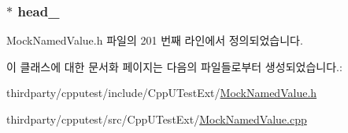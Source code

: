 \subsubsection[{\texorpdfstring{head\+\_\+}{head_}}]{$\ast$ head\+\_\+\hspace{0.3cm}{\ttfamily [private]}}\hypertarget{class_mock_named_value_list_a3bb1ff05bd34f0ac2f0ff66d8f5e2978}{}\label{class_mock_named_value_list_a3bb1ff05bd34f0ac2f0ff66d8f5e2978}


Mock\+Named\+Value.\+h 파일의 201 번째 라인에서 정의되었습니다.



이 클래스에 대한 문서화 페이지는 다음의 파일들로부터 생성되었습니다.\+:\begin{DoxyCompactItemize}
\item 
thirdparty/cpputest/include/\+Cpp\+U\+Test\+Ext/\hyperlink{_mock_named_value_8h}{Mock\+Named\+Value.\+h}\item 
thirdparty/cpputest/src/\+Cpp\+U\+Test\+Ext/\hyperlink{_mock_named_value_8cpp}{Mock\+Named\+Value.\+cpp}\end{DoxyCompactItemize}
